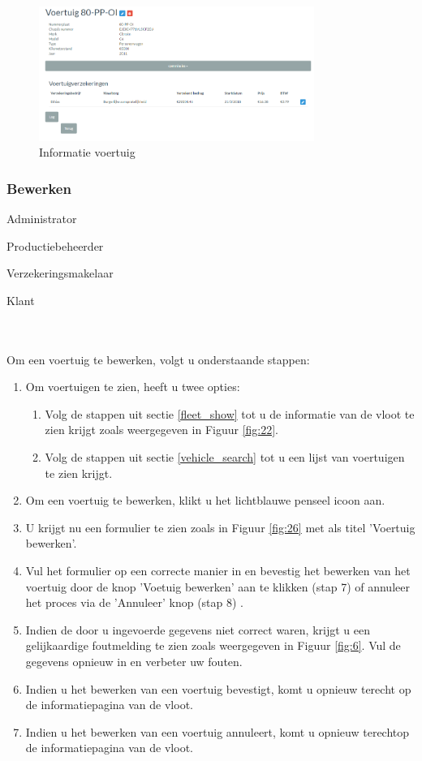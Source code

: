 \documentclass[11pt,openany]{article}
\newcommand{\cmark}{\ding{51}}%
\newcommand{\xmark}{\ding{55}}%
\newcommand{\done}{\rlap{$\square$}{\raisebox{2pt}{\large\hspace{1pt}\cmark}}%
	\hspace{-2.5pt}}
\newcommand{\wontfix}{\rlap{$\square$}{\large\hspace{1pt}\xmark}}
\begin{document}
\begin{figure}
	\centering
	\includegraphics[width=0.8\textwidth]{img/fig27.png}
	\caption{Informatie voertuig} 
	\label{fig:27} 
\end{figure}

\subsubsection{Bewerken}
\begin{todolist}
	\item[\done] Administrator
	\item[\done] Productiebeheerder
	\item[\done] Verzekeringsmakelaar
	\item[\wontfix] Klant 
\end{todolist}
\\
\\
Om een voertuig te bewerken, volgt u onderstaande stappen:
\begin{enumerate}
	\item Om voertuigen te zien, heeft u twee opties:
	\begin{enumerate}
		\item Volg de stappen uit sectie \ref{fleet_show} tot u de informatie van de vloot te zien krijgt zoals weergegeven in Figuur \ref{fig:22}.
		\item Volg de stappen uit sectie \ref{vehicle_search} tot u een lijst van voertuigen te zien krijgt.
	\end{enumerate}
	\item Om een voertuig te bewerken, klikt u het lichtblauwe penseel icoon aan. 
	\item U krijgt nu een formulier te zien zoals in Figuur \ref{fig:26} met als titel 'Voertuig bewerken'.
	\item Vul het formulier op een correcte manier in en bevestig het bewerken van het voertuig door de knop 'Voetuig bewerken' aan te klikken (stap 7) of annuleer het proces via de 'Annuleer' knop (stap 8) .
	\item Indien de door u ingevoerde gegevens niet correct waren, krijgt u een gelijkaardige foutmelding te zien zoals weergegeven in Figuur \ref{fig:6}. Vul de gegevens opnieuw in en verbeter uw fouten.
	\item Indien u het bewerken van een voertuig bevestigt, komt u opnieuw terecht op de informatiepagina van de vloot.  
	\item Indien u het bewerken van een voertuig annuleert, komt u opnieuw terechtop de informatiepagina van de vloot. 
	
\end{enumerate}
\newpage
\end{document}

